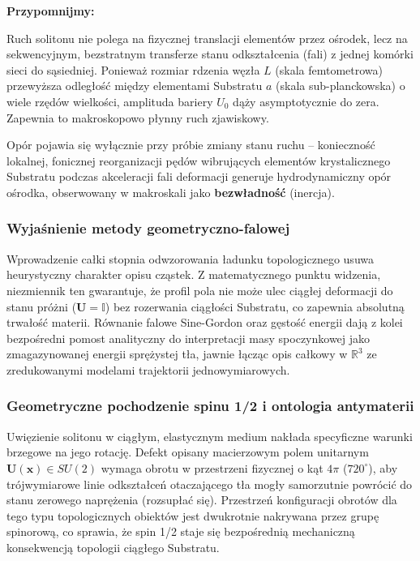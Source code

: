 \documentclass[
  polish,
  letterpaper,
  DIV=11,
  numbers=noendperiod,
  oneside]{scrartcl}
\begin{document}
\textbf{Przypomnijmy:}

Ruch solitonu nie polega na fizycznej translacji elementów przez
ośrodek, lecz na sekwencyjnym, bezstratnym transferze stanu
odkształcenia (fali) z jednej komórki sieci do sąsiedniej. Ponieważ
rozmiar rdzenia węzła \(L\) (skala femtometrowa) przewyższa odległość
między elementami Substratu \(a\) (skala sub-planckowska) o wiele rzędów
wielkości, amplituda bariery \(U_0\) dąży asymptotycznie do zera.
Zapewnia to makroskopowo płynny ruch zjawiskowy.

Opór pojawia się wyłącznie przy próbie zmiany stanu ruchu -- konieczność
lokalnej, fonicznej reorganizacji pędów wibrujących elementów
krystalicznego Substratu podczas akceleracji fali deformacji generuje
hydrodynamiczny opór ośrodka, obserwowany w makroskali jako
\textbf{bezwładność} (inercja).

\subsubsection{Wyjaśnienie metody geometryczno-falowej}\label{sec-1-6-3}

Wprowadzenie całki stopnia odwzorowania ładunku topologicznego usuwa
heurystyczny charakter opisu cząstek. Z matematycznego punktu widzenia,
niezmiennik ten gwarantuje, że profil pola nie może ulec ciągłej
deformacji do stanu próżni (\(\mathbf{U}=\mathbb{I}\)) bez rozerwania
ciągłości Substratu, co zapewnia absolutną trwałość materii. Równanie
falowe Sine-Gordon oraz gęstość energii dają z kolei bezpośredni pomost
analityczny do interpretacji masy spoczynkowej jako zmagazynowanej
energii sprężystej tła, jawnie łącząc opis całkowy w \(\mathbb{R}^3\) ze
zredukowanymi modelami trajektorii jednowymiarowych.

\subsubsection{Geometryczne pochodzenie spinu 1/2 i ontologia
antymaterii}\label{sec-1-6-4}

Uwięzienie solitonu w ciągłym, elastycznym medium nakłada specyficzne
warunki brzegowe na jego rotację. Defekt opisany macierzowym polem
unitarnym \(\mathbf{U}(\mathbf{x}) \in SU(2)\) wymaga obrotu w
przestrzeni fizycznej o kąt \(4\pi\) (\(720^\circ\)), aby trójwymiarowe
linie odkształceń otaczającego tła mogły samorzutnie powrócić do stanu
zerowego naprężenia (rozsupłać się). Przestrzeń konfiguracji obrotów dla
tego typu topologicznych obiektów jest dwukrotnie nakrywana przez grupę
spinorową, co sprawia, że spin 1/2 staje się bezpośrednią mechaniczną
konsekwencją topologii ciągłego Substratu.
\end{document}
